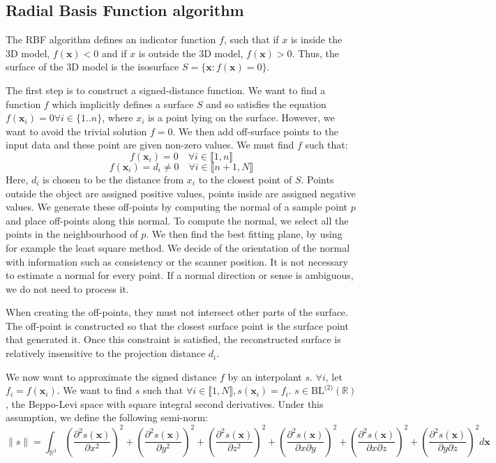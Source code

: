 \documentclass[a4paper]{article}
\begin{document}
\subsection{Radial Basis Function algorithm}
The RBF algorithm defines an indicator function $f$, such that if $x$ is inside the 3D model, $f(\boldsymbol{x}) < 0$ and if $x$ is outside the 3D model, $f(\boldsymbol{x}) > 0$. Thus, the surface of the 3D model is the isosurface $S = \{\boldsymbol{x}: f(\boldsymbol{x}) =0\}$.

The first step is to construct a signed-distance function. We want to find a function $f$ which implicitly defines a surface $S$ and so satisfies the equation $f(\boldsymbol{x}_i) = 0 \forall i \in \{1..n\}$, where $x_i$ is a point lying on the surface. However, we want to avoid the trivial solution $f = 0$. We then add off-surface points to the input data and these point are given non-zero values. We must find $f$ such that:
$$f(\boldsymbol{x}_i) = 0 \hspace{1em}\forall i \in \llbracket 1,n\rrbracket$$
$$f(\boldsymbol{x}_i) = d_i \ne 0 \hspace{1em}\forall i \in\llbracket n+1,N\rrbracket$$
Here, $d_i$ is chosen to be the distance from $x_i$ to the closest point of $S$. Points outside the object are assigned positive values, points inside are assigned negative values. We generate these off-points by computing the normal of a sample point $p$ and place off-points along this normal. To compute the normal, we select all the points in the neighbourhood of $p$. We then find the best fitting plane, by using for example the least square method. We decide of the orientation of the normal with information such as consistency or the scanner position. It is not necessary to estimate a normal for every point. If a normal direction or sense is ambiguous, we do not need to process it.

When creating the off-points, they must not intersect other parts of the surface. The off-point is constructed so that the closest surface point is the surface point that generated it. Once this constraint is satisfied, the reconstructed surface is relatively insensitive to the projection distance $d_i$.

We now want to approximate the signed distance $f$ by an interpolant $s$. $\forall i$, let $f_i = f(\boldsymbol{x}_i)$. We want to find $s$ such that $\forall i\in\llbracket 1,N\rrbracket, s(\boldsymbol{x}_i) = f_i$. $s \in \text{BL}^{\text{(2)}}(\mathbb{R})$, the Beppo-Levi space with square integral second derivatives. Under this assumption, we define the following semi-norm:
$$\|s\| = \int_{\mathbb{R}^3}\left(\frac{\partial^2s(\boldsymbol{x})}{\partial x^2}\right)^2 + \left(\frac{\partial^2s(\boldsymbol{x})}{\partial y^2}\right)^2 + \left(\frac{\partial^2s(\boldsymbol{x})}{\partial z^2}\right)^2 + \left(\frac{\partial^2s(\boldsymbol{x})}{\partial x\partial y}\right)^2 + \left(\frac{\partial^2s(\boldsymbol{x})}{\partial x\partial z}\right)^2 + \left(\frac{\partial^2s(\boldsymbol{x})}{\partial y\partial z}\right)^2 d\boldsymbol{x}$$
\end{document}

